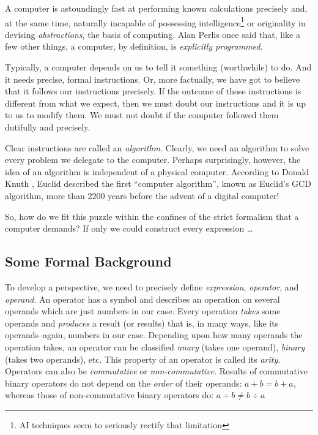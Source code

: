 \documentclass[english,smartquotes]{hgbarticle}
\begin{document}
A computer is astoundingly fast at performing known calculations precisely and, at the same time, naturally incapable of possessing intelligence\footnote{AI techniques seem to seriously rectify that limitation} or originality in devising \textit{abstractions}, the basis of computing. Alan Perlis once said \cite{Perlis1984} that, like a few other things, a computer, by definition, is \textit{explicitly programmed}. 

Typically, a computer depends on us to tell it something (worthwhile) to do. And it needs precise, formal instructions. Or, more factually, we have got to believe that it follows our instructions precisely. If the outcome of those instructions is different from what we expect, then we must doubt our instructions and it is up to us to modify them. We must not doubt if the computer followed them dutifully and precisely. 

Clear instructions are called an \emph{algorithm}. Clearly, we need an algorithm to solve every problem we delegate to the computer. Perhaps surprisingly, however, the idea of an algorithm is independent of a physical computer. According to Donald Knuth \cite{Knuth1997}, Euclid described the first ``computer algorithm'', known as Euclid's GCD algorithm, more than 2200 years before the advent of a digital computer!

So, how do we fit this puzzle within the confines of the strict formalism that a computer demands? If only we could construct every expression \dots

\subsection{Some Formal Background}
To develop a perspective, we need to precisely define \textit{expression}, \textit{operator}, and \textit{operand}. An operator has a symbol and describes an operation on several operands which are just numbers in our case. Every operation \textit{takes} some operands and \textit{produces} a result (or results) that is, in many ways, like its operands--again, numbers in our case. Depending upon how many operands the operation takes, an operator can be classified \textit{unary} (takes one operand), \textit{binary} (takes two operands), etc. This property of an operator is called its \textit{arity}. Operators can also be \emph{commutative} or \emph{non-commutative}. Results of commutative binary operators do not depend on the \emph{order} of their operands: $a+b=b+a$, whereas those of non-commutative binary operators do: $a\div b \ne b\div a$ 
\end{document}
